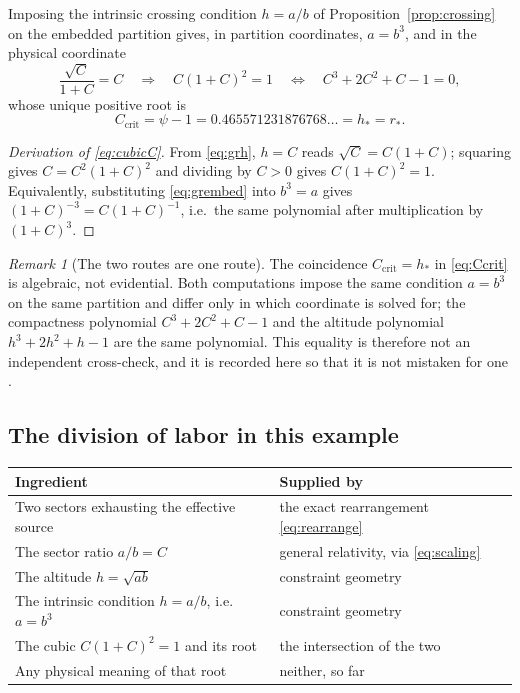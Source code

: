 \documentclass[11pt,a4paper]{article}
\theoremstyle{definition}
\theoremstyle{plain}
\theoremstyle{remark}
\newtheorem{remark}[definition]{Remark}
\newcommand{\Ccrit}{C_{\mathrm{crit}}}
\begin{document}
Imposing the intrinsic crossing condition $h=a/b$ of
Proposition~\ref{prop:crossing} on the embedded partition gives, in partition
coordinates, $a=b^{3}$, and in the physical coordinate
\begin{equation}
\frac{\sqrt C}{1+C}=C
\quad\Longrightarrow\quad
C(1+C)^{2}=1
\quad\Longleftrightarrow\quad
C^{3}+2C^{2}+C-1=0 ,
\label{eq:cubicC}
\end{equation}
whose unique positive root is
\begin{equation}
\Ccrit=\psi-1=0.465571231876768\ldots=h_{*}=r_{*} .
\label{eq:Ccrit}
\end{equation}

\begin{proof}[Derivation of \eqref{eq:cubicC}]
From \eqref{eq:grh}, $h=C$ reads $\sqrt C=C(1+C)$; squaring gives
$C=C^{2}(1+C)^{2}$ and dividing by $C>0$ gives $C(1+C)^{2}=1$. Equivalently,
substituting \eqref{eq:grembed} into $b^{3}=a$ gives $(1+C)^{-3}=C(1+C)^{-1}$,
i.e.\ the same polynomial after multiplication by $(1+C)^{3}$.
\end{proof}

\begin{remark}[The two routes are one route]
\label{rem:notindependent}
The coincidence $\Ccrit=h_{*}$ in \eqref{eq:Ccrit} is algebraic, not
evidential. Both computations impose the same condition $a=b^{3}$ on the same
partition and differ only in which coordinate is solved for; the compactness
polynomial $C^{3}+2C^{2}+C-1$ and the altitude polynomial
$h^{3}+2h^{2}+h-1$ are the same polynomial. This equality is therefore not an
independent cross-check, and it is recorded here so that it is not mistaken
for one \cite{CubicThreshold}.
\end{remark}

\subsection{The division of labor in this example}

\begin{center}
\begin{tabular}{@{}ll@{}}
\toprule
Ingredient & Supplied by \\
\midrule
Two sectors exhausting the effective source & the exact rearrangement
\eqref{eq:rearrange} \\
The sector ratio $a/b=C$ & general relativity, via \eqref{eq:scaling} \\
The altitude $h=\sqrt{ab}$ & constraint geometry \\
The intrinsic condition $h=a/b$, i.e.\ $a=b^{3}$ & constraint geometry \\
The cubic $C(1+C)^{2}=1$ and its root & the intersection of the two \\
Any physical meaning of that root & neither, so far \\
\bottomrule
\end{tabular}
\end{center}
\end{document}
